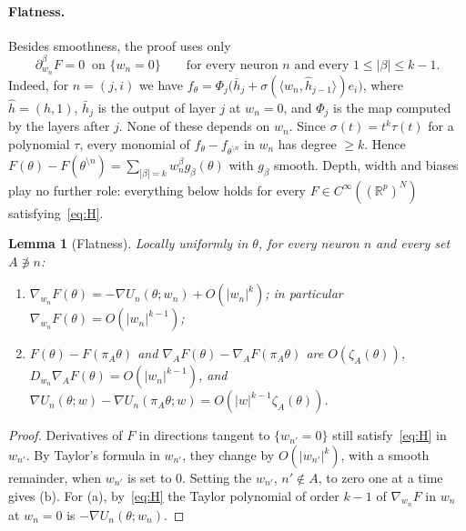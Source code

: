 \documentclass[11pt]{article}
\newtheorem{lemma}{Lemma}
\theoremstyle{definition}
\theoremstyle{remark}
\newcommand{\R}{\mathbb{R}}
\newcommand{\sm}{\setminus}
\newcommand{\ip}[2]{\langle #1,#2\rangle}
\begin{document}
\paragraph{Flatness.} Besides smoothness, the proof uses only
\begin{equation}\tag{H}\label{eq:H}
\partial^\beta_{w_n}F=0\ \text{ on }\{w_n=0\}\qquad\text{for every neuron $n$ and every $1\le|\beta|\le k-1$.}
\end{equation}
Indeed, for $n=(j,i)$ we have $f_\theta=\Phi_j\big(\bar h_j+\sigma(\ip{w_n}{\hat h_{j-1}})e_i\big)$, where $\hat h=(h,1)$, $\bar h_j$ is the output of layer $j$ at $w_n=0$, and $\Phi_j$ is the map computed by the layers after $j$. None of these depends on $w_n$. Since $\sigma(t)=t^k\tau(t)$ for a polynomial $\tau$, every monomial of $f_\theta-f_{\theta^{\sm n}}$ in $w_n$ has degree $\ge k$. Hence $F(\theta)-F(\theta^{\sm n})=\sum_{|\beta|=k}w_n^\beta g_\beta(\theta)$ with $g_\beta$ smooth. Depth, width and biases play no further role: everything below holds for every $F\in C^\infty((\R^p)^N)$ satisfying~\eqref{eq:H}.

\begin{lemma}[Flatness]\label{lem:flat}
Locally uniformly in $\theta$, for every neuron $n$ and every set $A\not\ni n$:
\begin{enumerate}[label=\textup{(\alph*)},nosep]
\item $\nabla_{w_n}F(\theta)=-\nabla U_n(\theta;w_n)+O(|w_n|^k)$; in particular $\nabla_{w_n}F(\theta)=O(|w_n|^{k-1})$;
\item $F(\theta)-F(\pi_A\theta)$ and $\nabla_AF(\theta)-\nabla_AF(\pi_A\theta)$ are $O(\zeta_A(\theta))$, $D_{w_n}\nabla_AF(\theta)=O(|w_n|^{k-1})$, and $\nabla U_n(\theta;w)-\nabla U_n(\pi_A\theta;w)=O(|w|^{k-1}\zeta_A(\theta))$.
\end{enumerate}
\end{lemma}

\begin{proof}
Derivatives of $F$ in directions tangent to $\{w_{n'}=0\}$ still satisfy~\eqref{eq:H} in $w_{n'}$. By Taylor's formula in $w_{n'}$, they change by $O(|w_{n'}|^k)$, with a smooth remainder, when $w_{n'}$ is set to $0$. Setting the $w_{n'}$, $n'\notin A$, to zero one at a time gives (b). For (a), by~\eqref{eq:H} the Taylor polynomial of order $k-1$ of $\nabla_{w_n}F$ in $w_n$ at $w_n=0$ is $-\nabla U_n(\theta;w_n)$.
\end{proof}
\end{document}
